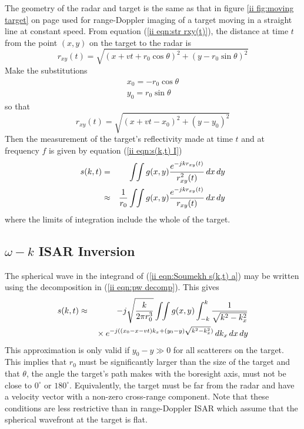 The geometry of the radar and target is the same as that in figure
\ref{ii fig:moving target} on page \pageref{ii fig:moving target} used for 
range-Doppler imaging of a target moving in a straight line at constant
speed.  From equation (\ref{ii eqn:str rxy(t)}), the distance at time $t$
from the point  $(x,y)$ on the target to the radar is
\begin{equation}
r_{xy}(t)=\sqrt{(x+vt+r_0\cos\theta)^2+(y-r_0\sin\theta)^2}
\end{equation}
Make the substitutions
\begin{eqnarray}
x_0=-r_0\cos\theta\\
y_0=r_0\sin\theta
\end{eqnarray}
so that
\begin{equation}
r_{xy}(t)=\sqrt{(x+vt-x_0)^2+(y-y_0)^2}
\end{equation}
Then the measurement of the target's reflectivity made 
at time $t$ and at frequency $f$ is given by equation (\ref{ii eqn:s(k,t) I})
\begin{eqnarray}
s(k,t)
&=&\int\!\!\int g(x,y) \frac{\displaystyle e^{-jkr_{xy}(t)}}{\displaystyle r_{xy}^2(t)}\,dx\,dy{\nonumber}\\
&\approx&\frac{1}{r_0}\int\!\!\int g(x,y)
\frac{\displaystyle e^{-jkr_{xy}(t)}}{\displaystyle r_{xy}(t)}\,dx\,dy
\label{ii eqn:Soumekh s(k,t) a}
\end{eqnarray}
where the limits of integration include the whole of the target.

\subsection{$\omega-k$ ISAR Inversion}

The spherical wave in the integrand of (\ref{ii eqn:Soumekh s(k,t) a})
may be written using the decomposition in (\ref{ii eqn:pw decomp}).  
This gives
\begin{eqnarray}
s(k,t)&\approx&-j\sqrt{\frac{k}{2\pi r_0^3}}\int\!\!\int g(x,y)
\int_{-k}^k \frac{1}{\sqrt{k^2-k_x^2}}				{\nonumber}\\
&&{}\times e^{-j((x_0-x-vt)k_x+(y_0-y)\sqrt{k^2-k_x^2})}\,dk_x\,dx\,dy
\end{eqnarray}
This approximation is only valid if $y_0-y\gg 0$ for all scatterers on the
target.  This implies that $r_0$ must be significantly larger than the size 
of the target and that $\theta$, the angle the target's path makes with the
boresight axis, must not be close to $0^{\circ}$ or $180^{\circ}$. 
Equivalently, the target must be far from the radar and have a velocity
vector with a non-zero cross-range component.  Note that these conditions 
are less restrictive than in range-Doppler ISAR which assume that the 
spherical wavefront at the target is flat.


